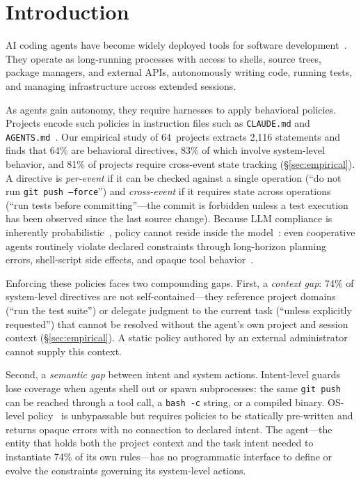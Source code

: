 \section{Introduction}


AI coding agents have become widely deployed tools for software
development~\cite{agentsight}. They operate as long-running processes with
access to shells, source trees, package managers, and external APIs,
autonomously writing code, running tests, and managing infrastructure across
extended sessions.

As agents gain autonomy, they require harnesses to apply behavioral
policies. Projects encode such policies in instruction files such
as \texttt{CLAUDE.md} and
\texttt{AGENTS.md}~\cite{chatlatanagulchai2025manifests,lulla2026agentsmd}.
Our empirical study of 64~projects extracts 2{,}116 statements and finds
that 64\% are behavioral directives, 83\% of which involve system-level
behavior, and 81\% of projects require cross-event state tracking
(\S\ref{sec:empirical}).
A directive is \emph{per-event} if it can be checked against a single
operation (``do not run \texttt{git push --force}'') and
\emph{cross-event} if it requires state across operations (``run tests
before committing''---the commit is forbidden unless a test execution
has been observed since the last source change).
Because LLM compliance is inherently
probabilistic~\cite{liu2024lost}, policy cannot reside inside the
model~\cite{langchain-harness,fowler-harness}: even cooperative agents
routinely violate declared constraints through long-horizon planning
errors, shell-script side effects, and opaque tool
behavior~\cite{jimenez2024swebench}.

Enforcing these policies faces two compounding gaps. First, a
\emph{context gap}: 74\% of system-level directives are not
self-contained---they reference project domains (``run the test suite'')
or delegate judgment to the current task (``unless explicitly
requested'') that cannot be resolved without the agent's own project
and session context (\S\ref{sec:empirical}). A static policy authored
by an external administrator cannot supply this context.

Second, a \emph{semantic gap} between intent and system actions.
Intent-level guards~\cite{wang2025agentspec,shi2025progent} lose coverage
when agents shell out or spawn subprocesses:
the same \texttt{git~push} can be reached through a tool call, a
\texttt{bash~-c} string, or a compiled binary.
OS-level policy~\cite{ciliumtetragon,flume,pasquier2018camquery} is
unbypassable but requires policies to be statically pre-written
and returns opaque errors with no connection to declared intent.
The agent---the entity that holds both the project context and the
task intent needed to instantiate 74\% of its own rules---has no
programmatic interface to define or evolve the constraints governing
its system-level actions.

